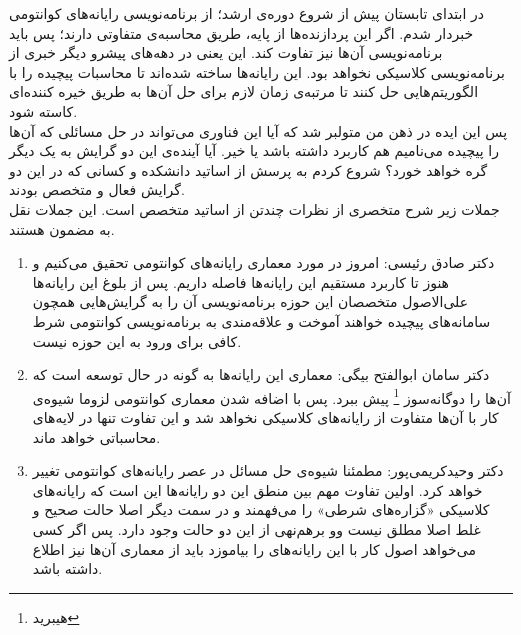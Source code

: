 در ابتدای تابستان پیش از شروع دوره‌ی ارشد؛ از برنامه‌نویسی رایانه‌های کوانتومی خبردار شدم. اگر این پردازنده‌ها از پایه، طریق محاسبه‌ی متفاوتی دارند؛ پس باید برنامه‌نویسی آن‌ها نیز تفاوت کند. این یعنی در دهه‌های پیشرو دیگر خبری از برنامه‌نویسی کلاسیکی نخواهد بود. این رایانه‌ها ساخته شده‌اند تا محاسبات پیچیده را با الگوریتم‌هایی حل کنند تا مرتبه‌ی زمان لازم برای حل آن‌ها به طریق خیره کننده‌ای کاسته شود.\\
پس این ایده در ذهن من متولبر شد که آیا این فناوری می‌تواند در حل مسائلی که آن‌ها را پیچیده می‌نامیم هم کاربرد داشته باشد یا خیر.  آیا آینده‌ی این دو گرایش به یک دیگر گره خواهد خورد؟ شروع کردم به پرسش از اساتید دانشکده و کسانی که در این دو گرایش فعال و متخصص بودند.\\
جملات زیر شرح متخصری از نظرات چندتن از اساتید متخصص است. این جملات نقل به مضمون هستند.
\begin{enumerate}
	\item 
	دکتر صادق رئیسی: امروز در مورد معماری رایانه‌های کوانتومی تحقیق می‌کنیم و هنوز تا کاربرد مستقیم این رایانه‌ها فاصله داریم. پس از بلوغ این رایانه‌ها علی‌الاصول متخصصان این حوزه برنامه‌نویسی آن را به گرایش‌هایی همچون سامانه‌های پیچیده خواهند آموخت و علاقه‌مندی به برنامه‌نویسی کوانتومی شرط کافی برای ورود به این حوزه نیست.
	\item
	دکتر سامان ابوالفتح بیگی: معماری این رایانه‌ها به گونه در حال توسعه است که آن‌ها را دوگانه‌سوز \footnote{هیبرید} پیش ببرد. پس با اضافه شدن معماری کوانتومی لزوما شیوه‌ی کار با آن‌ها متفاوت از رایانه‌های کلاسیکی نخواهد شد و این تفاوت تنها در لایه‌های محاسباتی خواهد ماند.
	\item 
	دکتر وحیدکریمی‌پور: مطمئنا شیوه‌ی حل مسائل در عصر رایانه‌های کوانتومی تغییر خواهد کرد. اولین تفاوت مهم بین منطق این دو رایانه‌ها این است که رایانه‌های کلاسیکی «گزاره‌های شرطی» را می‌فهمند و در سمت دیگر اصلا حالت صحیح و غلط اصلا مطلق نیست وو برهم‌نهی از این دو حالت وجود دارد. پس اگر کسی می‌خواهد اصول کار با این رایانه‌های را بیاموزد باید از معماری آن‌ها نیز اطلاع داشته باشد.

\end{enumerate}




